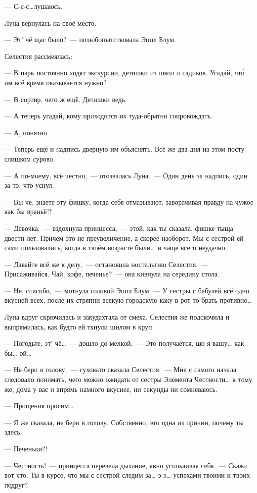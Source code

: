 \documentclass[fontsize=11pt,a5paper,titlepage=firstcover]{scrbook}
\begin{document}
--- С-с-с{\ldots}лушаюсь.

Луна вернулась на своё место.

--- Эт’ чё щас было?~--- полюбопытствовала Эппл Блум.

Селестия рассмеялась:

--- В парк постоянно ходят экскурсии, детишки из школ и садиков. Угадай, что́ им всё время оказывается нужно?

--- В сортир, чего ж ещё. Детишки ведь.

--- А теперь угадай, кому приходится их туда-обратно сопровождать.

--- А, понятно.

--- Теперь ещё и надпись дверную им объяснять. Всё же два дня на этом посту слишком сурово.

--- А по-моему, всё честно,~--- отозвалась Луна.~--- Один день за надпись, один за то, что уснул.

--- Вы чё, знаете эту фишку, когда себя отмазывают, заворачивая правду на чужое как бы враньё?!

--- Девочка,~--- вздохнула принцесса,~--- этой, как ты сказала, фишке тыща двести лет. Причём это не преувеличение, а скорее наоборот. Мы с сестрой ей сами пользовались, когда в твоём возрасте были{\ldots} и чаще всего неудачно.

--- Давайте всё же к делу,~--- остановила ностальгию Селестия.~--- Присаживайся. Чай, кофе, печенье?~--- она кивнула на середину стола.

--- Не, спасибо,~--- мотнула головой Эппл Блум. --- У сестры с бабулей всё одно вкусней всех, после их стряпни всякую городскую каку в рот-то брать противно{\ldots}

Луна вдруг скрючилась и закудахтала от смеха. Селестия же подскочила и выпрямилась, как будто ей ткнули шилом в круп.

--- Погодьте, эт’ чё{\ldots}~--- дошло до мелкой.~--- Это получается, шо я вашу{\ldots} как бы{\ldots} ой{\ldots}

--- Не бери в голову,~--- суховато сказала Селестия.~--- Мне с самого начала следовало понимать, чего можно ожидать от сестры Элемента Честности{\ldots} к тому же, дома у вас и впрямь намного вкуснее, ни секунды ни сомневаюсь.

--- Прощения просим{\ldots}

--- Я же сказала, не бери в голову. Собственно, это одна из причин, почему ты здесь.

--- Печеньки?!

--- Честность!~--- принцесса перевела дыхание, явно успокаивая себя.~--- Скажи вот что. Ты в курсе, что мы с сестрой следим за{\ldots} э-э{\ldots} успехами твоими и твоих подруг?
\end{document}
